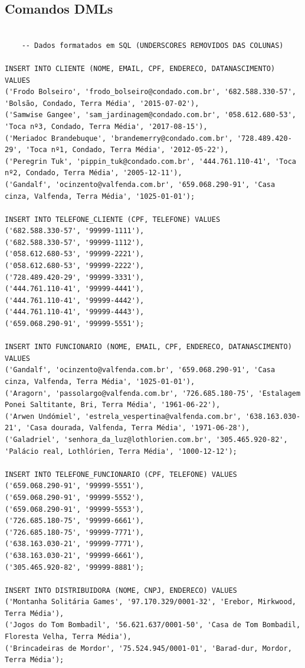 \documentclass[11pt]{article}
\begin{document}
\subsection{Comandos DMLs}
\begin{Verbatim}[breaklines=true, breakanywhere=true]
    
    -- Dados formatados em SQL (UNDERSCORES REMOVIDOS DAS COLUNAS)

INSERT INTO CLIENTE (NOME, EMAIL, CPF, ENDERECO, DATANASCIMENTO) VALUES
('Frodo Bolseiro', 'frodo_bolseiro@condado.com.br', '682.588.330-57', 'Bolsão, Condado, Terra Média', '2015-07-02'),
('Samwise Gangee', 'sam_jardinagem@condado.com.br', '058.612.680-53', 'Toca nº3, Condado, Terra Média', '2017-08-15'),
('Meriadoc Brandebuque', 'brandemerry@condado.com.br', '728.489.420-29', 'Toca nº1, Condado, Terra Média', '2012-05-22'),
('Peregrin Tuk', 'pippin_tuk@condado.com.br', '444.761.110-41', 'Toca nº2, Condado, Terra Média', '2005-12-11'),
('Gandalf', 'ocinzento@valfenda.com.br', '659.068.290-91', 'Casa cinza, Valfenda, Terra Média', '1025-01-01');

INSERT INTO TELEFONE_CLIENTE (CPF, TELEFONE) VALUES
('682.588.330-57', '99999-1111'),
('682.588.330-57', '99999-1112'),
('058.612.680-53', '99999-2221'),
('058.612.680-53', '99999-2222'),
('728.489.420-29', '99999-3331'),
('444.761.110-41', '99999-4441'),
('444.761.110-41', '99999-4442'),
('444.761.110-41', '99999-4443'),
('659.068.290-91', '99999-5551');

INSERT INTO FUNCIONARIO (NOME, EMAIL, CPF, ENDERECO, DATANASCIMENTO) VALUES
('Gandalf', 'ocinzento@valfenda.com.br', '659.068.290-91', 'Casa cinza, Valfenda, Terra Média', '1025-01-01'),
('Aragorn', 'passolargo@valfenda.com.br', '726.685.180-75', 'Estalagem Ponei Saltitante, Bri, Terra Média', '1961-06-22'),
('Arwen Undómiel', 'estrela_vespertina@valfenda.com.br', '638.163.030-21', 'Casa dourada, Valfenda, Terra Média', '1971-06-28'),
('Galadriel', 'senhora_da_luz@lothlorien.com.br', '305.465.920-82', 'Palácio real, Lothlórien, Terra Média', '1000-12-12');

INSERT INTO TELEFONE_FUNCIONARIO (CPF, TELEFONE) VALUES
('659.068.290-91', '99999-5551'),
('659.068.290-91', '99999-5552'),
('659.068.290-91', '99999-5553'),
('726.685.180-75', '99999-6661'),
('726.685.180-75', '99999-7771'),
('638.163.030-21', '99999-7771'),
('638.163.030-21', '99999-6661'),
('305.465.920-82', '99999-8881');

INSERT INTO DISTRIBUIDORA (NOME, CNPJ, ENDERECO) VALUES
('Montanha Solitária Games', '97.170.329/0001-32', 'Erebor, Mirkwood, Terra Média'),
('Jogos do Tom Bombadil', '56.621.637/0001-50', 'Casa de Tom Bombadil, Floresta Velha, Terra Média'),
('Brincadeiras de Mordor', '75.524.945/0001-01', 'Barad-dur, Mordor, Terra Média');


\end{Verbatim}
\end{document}
